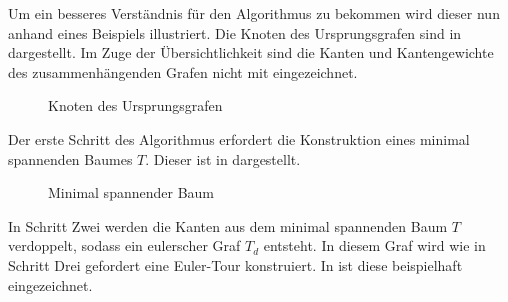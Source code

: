 \documentclass{article}
\begin{document}
Um ein besseres Verständnis für den Algorithmus zu bekommen wird dieser nun anhand eines Beispiels illustriert. Die Knoten des Ursprungsgrafen sind in  dargestellt. Im Zuge der Übersichtlichkeit sind die Kanten und Kantengewichte des zusammenhängenden Grafen nicht mit eingezeichnet.
\begin{figure}[H]
\centering
{}
\caption{Knoten des Ursprungsgrafen}
\label{fig:ursprungs-graf-blank}
\end{figure}
Der erste Schritt des Algorithmus erfordert die Konstruktion eines minimal spannenden Baumes $T$. Dieser ist in  dargestellt.
\begin{figure}[H]
\centering
{}
\caption{Minimal spannender Baum}
\label{fig:ursprungs-graf-mst}
\end{figure}
In Schritt Zwei werden die Kanten aus dem minimal spannenden Baum $T$ verdoppelt, sodass ein eulerscher Graf $T_d$ entsteht. In diesem Graf wird wie in Schritt Drei gefordert eine Euler-Tour konstruiert. In  ist diese beispielhaft eingezeichnet.
\end{document}
